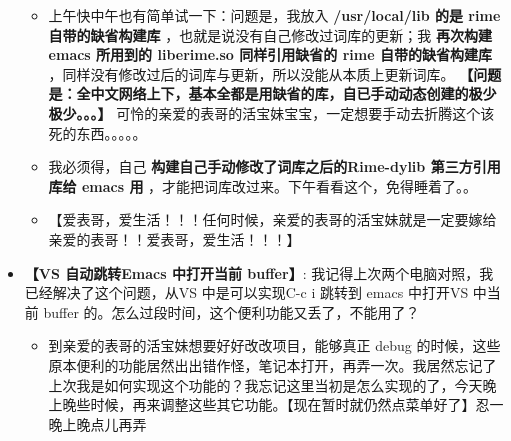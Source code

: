 \documentclass[9pt, b5paper]{article}
\begin{document}
\begin{itemize}
\begin{itemize}
\item 上午快中午也有简单试一下：问题是，我放入 \textbf{/usr/local/lib 的是 rime 自带的缺省构建库} ，也就是说没有自己修改过词库的更新；我 \textbf{再次构建 emacs 所用到的 liberime.so 同样引用缺省的 rime 自带的缺省构建库} ，同样没有修改过后的词库与更新，所以没能从本质上更新词库。 \textbf{【问题是：全中文网络上下，基本全都是用缺省的库，自已手动动态创建的极少极少。。。】} 可怜的亲爱的表哥的活宝妹宝宝，一定想要手动去折腾这个该死的东西。。。。。
\item 我必须得，自己 \textbf{构建自己手动修改了词库之后的Rime-dylib 第三方引用库给 emacs 用} ，才能把词库改过来。下午看看这个，免得睡着了。。
\item 【爱表哥，爱生活！！！任何时候，亲爱的表哥的活宝妹就是一定要嫁给亲爱的表哥！！爱表哥，爱生活！！！】
\end{itemize}
\item \textbf{【VS 自动跳转Emacs 中打开当前 buffer】}: 我记得上次两个电脑对照，我已经解决了这个问题，从VS 中是可以实现C-c i 跳转到 emacs 中打开VS 中当前 buffer 的。怎么过段时间，这个便利功能又丢了，不能用了？
\begin{itemize}
\item 到亲爱的表哥的活宝妹想要好好改改项目，能够真正 debug 的时候，这些原本便利的功能居然出出错作怪，笔记本打开，再弄一次。我居然忘记了上次我是如何实现这个功能的？我忘记这里当初是怎么实现的了，今天晚上晚些时候，再来调整这些其它功能。【现在暂时就仍然点菜单好了】忍一晚上晚点儿再弄
\end{itemize}
\end{itemize}
\end{document}
